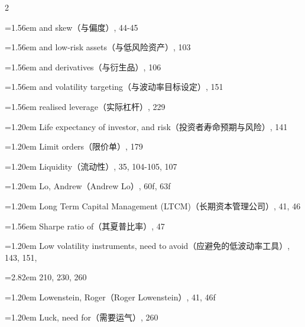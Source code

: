 {\begin{multicols}{2}
\par \noindent\hangindent=1.56em\hspace*{0.36em} and skew（与偏度）, 44-45
\par \noindent\hangindent=1.56em\hspace*{0.36em} and low-risk assets（与低风险资产）, 103
\par \noindent\hangindent=1.56em\hspace*{0.36em} and derivatives（与衍生品）, 106
\par \noindent\hangindent=1.56em\hspace*{0.36em} and volatility targeting（与波动率目标设定）, 151
\par \noindent\hangindent=1.56em\hspace*{0.36em} realised leverage（实际杠杆）, 229
\par \noindent\hangindent=1.20em\hspace*{0.00em} Life expectancy of investor, and risk（投资者寿命预期与风险）, 141
\par \noindent\hangindent=1.20em\hspace*{0.00em} Limit orders（限价单）, 179
\par \noindent\hangindent=1.20em\hspace*{0.00em} Liquidity（流动性）, 35, 104-105, 107
\par \noindent\hangindent=1.20em\hspace*{0.00em} Lo, Andrew（Andrew Lo）, 60f, 63f
\par \noindent\hangindent=1.20em\hspace*{0.00em} Long Term Capital Management (LTCM)（长期资本管理公司）, 41, 46
\par \noindent\hangindent=1.56em\hspace*{0.36em} Sharpe ratio of（其夏普比率）, 47
\par \noindent\hangindent=1.20em\hspace*{0.00em} Low volatility instruments, need to avoid（应避免的低波动率工具）, 143, 151,
\par \noindent\hangindent=2.82em\hspace*{1.62em} 210, 230, 260
\par \noindent\hangindent=1.20em\hspace*{0.00em} Lowenstein, Roger（Roger Lowenstein）, 41, 46f
\par \noindent\hangindent=1.20em\hspace*{0.00em} Luck, need for（需要运气）, 260

\end{multicols}}
